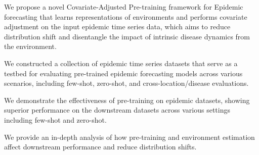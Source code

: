 \begin{compactenum}[\textbullet]

    \item We propose a novel Covariate-Adjusted Pre-training framework for Epidemic forecasting that learns representations of environments and performs covariate adjustment on the input epidemic time series data, which aims to reduce distribution shift and disentangle the impact of intrinsic disease dynamics from the environment. 

    \item We constructed a collection of epidemic time series datasets that serve as a testbed for evaluating pre-trained epidemic forecasting models across various scenarios, including few-shot, zero-shot, and cross-location/disease evaluations.



    
    \item We demonstrate the effectiveness of pre-training on epidemic datasets, showing superior performance on the downstream datasets across various settings including few-shot and zero-shot. 

    \item We provide an in-depth analysis of how pre-training and environment estimation affect downstream performance and reduce distribution shifts.


    
    
\end{compactenum}




